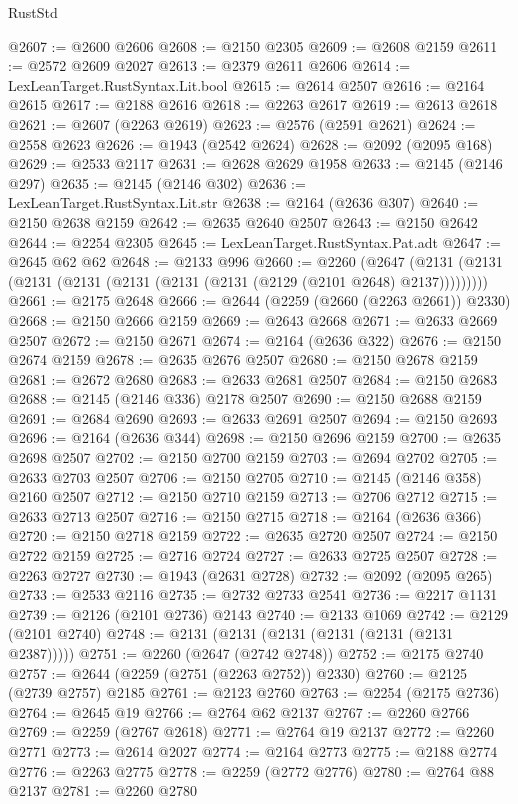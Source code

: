 \begin{lexlean}{RustStd}
\begin{coremodule}
@2607 := @2600 @2606
@2608 := @2150 @2305
@2609 := @2608 @2159
@2611 := @2572 @2609 @2027
@2613 := @2379 @2611 @2606
@2614 := LexLeanTarget.RustSyntax.Lit.bool
@2615 := @2614 @2507
@2616 := @2164 @2615
@2617 := @2188 @2616
@2618 := @2263 @2617
@2619 := @2613 @2618
@2621 := @2607 (@2263 @2619)
@2623 := @2576 (@2591 @2621)
@2624 := @2558 @2623
@2626 := @1943 (@2542 @2624)
@2628 := @2092 (@2095 @168)
@2629 := @2533 @2117
@2631 := @2628 @2629 @1958
@2633 := @2145 (@2146 @297)
@2635 := @2145 (@2146 @302)
@2636 := LexLeanTarget.RustSyntax.Lit.str
@2638 := @2164 (@2636 @307)
@2640 := @2150 @2638 @2159
@2642 := @2635 @2640 @2507
@2643 := @2150 @2642
@2644 := @2254 @2305
@2645 := LexLeanTarget.RustSyntax.Pat.adt
@2647 := @2645 @62 @62
@2648 := @2133 @996
@2660 := @2260
    (@2647 (@2131 (@2131 (@2131 (@2131 (@2131 (@2131 (@2131 (@2129 (@2101 @2648) @2137)))))))))
@2661 := @2175 @2648
@2666 := @2644 (@2259 (@2660 (@2263 @2661)) @2330)
@2668 := @2150 @2666 @2159
@2669 := @2643 @2668
@2671 := @2633 @2669 @2507
@2672 := @2150 @2671
@2674 := @2164 (@2636 @322)
@2676 := @2150 @2674 @2159
@2678 := @2635 @2676 @2507
@2680 := @2150 @2678 @2159
@2681 := @2672 @2680
@2683 := @2633 @2681 @2507
@2684 := @2150 @2683
@2688 := @2145 (@2146 @336) @2178 @2507
@2690 := @2150 @2688 @2159
@2691 := @2684 @2690
@2693 := @2633 @2691 @2507
@2694 := @2150 @2693
@2696 := @2164 (@2636 @344)
@2698 := @2150 @2696 @2159
@2700 := @2635 @2698 @2507
@2702 := @2150 @2700 @2159
@2703 := @2694 @2702
@2705 := @2633 @2703 @2507
@2706 := @2150 @2705
@2710 := @2145 (@2146 @358) @2160 @2507
@2712 := @2150 @2710 @2159
@2713 := @2706 @2712
@2715 := @2633 @2713 @2507
@2716 := @2150 @2715
@2718 := @2164 (@2636 @366)
@2720 := @2150 @2718 @2159
@2722 := @2635 @2720 @2507
@2724 := @2150 @2722 @2159
@2725 := @2716 @2724
@2727 := @2633 @2725 @2507
@2728 := @2263 @2727
@2730 := @1943 (@2631 @2728)
@2732 := @2092 (@2095 @265)
@2733 := @2533 @2116
@2735 := @2732 @2733 @2541
@2736 := @2217 @1131
@2739 := @2126 (@2101 @2736) @2143
@2740 := @2133 @1069
@2742 := @2129 (@2101 @2740)
@2748 := @2131 (@2131 (@2131 (@2131 (@2131 (@2131 @2387)))))
@2751 := @2260 (@2647 (@2742 @2748))
@2752 := @2175 @2740
@2757 := @2644 (@2259 (@2751 (@2263 @2752)) @2330)
@2760 := @2125 (@2739 @2757) @2185
@2761 := @2123 @2760
@2763 := @2254 (@2175 @2736)
@2764 := @2645 @19
@2766 := @2764 @62 @2137
@2767 := @2260 @2766
@2769 := @2259 (@2767 @2618)
@2771 := @2764 @19 @2137
@2772 := @2260 @2771
@2773 := @2614 @2027
@2774 := @2164 @2773
@2775 := @2188 @2774
@2776 := @2263 @2775
@2778 := @2259 (@2772 @2776)
@2780 := @2764 @88 @2137
@2781 := @2260 @2780

\end{coremodule}
\end{lexlean}
